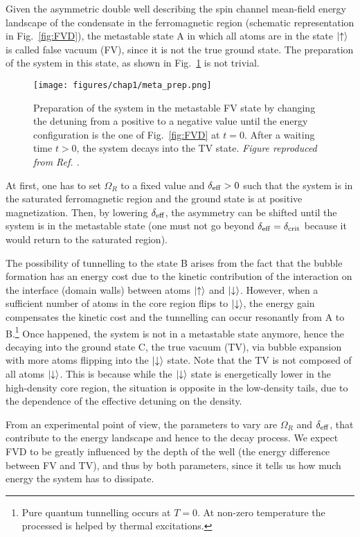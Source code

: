 Given the asymmetric double well describing the spin channel mean-field energy landscape of the condensate in the ferromagnetic region (schematic representation in Fig.\ \ref{fig:FVD}), the metastable state A in which all atoms are in the state $\ket{\uparrow}$ is called false vacuum (FV), since it is not the true ground state. The preparation of the system  in this state, as shown in Fig.\ \ref{fig:meta_prep} is not trivial. 
\begin{figure}[ht!]
    \centering
    \texttt{[image: figures/chap1/meta\_prep.png]}
    \caption{Preparation of the system in the metastable FV state by changing the detuning from a positive to a negative value until the energy configuration is the one of Fig.\ \ref{fig:FVD} at $t = 0$. After a waiting time $t > 0$, the system decays into the TV state. \textit{Figure reproduced from Ref. \cite{zenesini2024false}}.}
    \label{fig:meta_prep}
\end{figure}
At first, one has to set $\Omega_R$ to a fixed value and $\delta_{\rm eff} > 0$ such that the system is in the saturated ferromagnetic region and the ground state is at positive magnetization. Then, by lowering $\delta_{\rm eff}$, the asymmetry can be shifted until the system is in the metastable state (one must not go beyond $\delta_{\rm eff} = \delta_{\rm crit}$ because it would return to the saturated region). 

The possibility of tunnelling to the state B arises from the fact that the bubble formation has an energy cost due to the kinetic contribution of the interaction on the interface (domain walls) between atoms $\ket{\uparrow}$ and $\ket{\downarrow}$. However, when a sufficient number of atoms in the core region flips to $\ket{\downarrow}$, the energy gain compensates the kinetic cost and the tunnelling can occur resonantly from A to B.\footnote{Pure quantum tunnelling occurs at $T = 0$. At non-zero temperature the processed is helped by thermal excitations.} Once happened, the system is not in a metastable state anymore, hence the decaying into the ground state C, the true vacuum (TV), via bubble expansion with more atoms flipping into the $\ket{\downarrow}$ state. Note that the TV is not composed of all atoms $\ket{\downarrow}$. This is because while the $\ket{\downarrow}$ state is energetically lower in the high-density core region, the situation is opposite in the low-density tails, due to the dependence of the effective detuning on the density.

From an experimental point of view, the parameters to vary are $\Omega_R$ and $\delta_{\rm eff}$, that contribute to the energy landscape and hence to the decay process. We expect FVD to be greatly influenced by the depth of the well (the energy difference between FV and TV), and thus by both parameters, since it tells us how much energy the system has to dissipate. 


